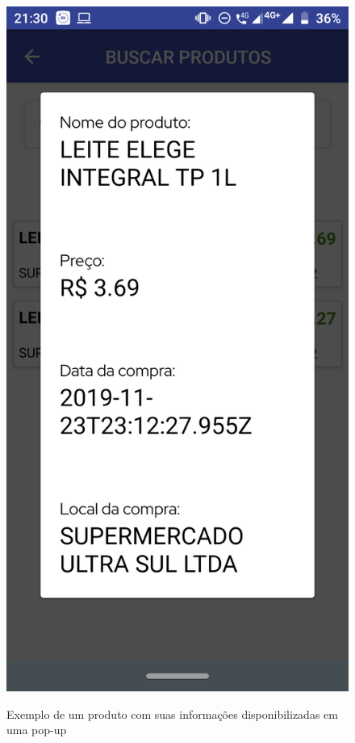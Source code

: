 \begin{figure}[h]
    \centering
    \caption{Exemplo de um produto com suas informações disponibilizadas em uma pop-up}
    \includegraphics[scale=0.15]{tcc/figures/app/app_buscar_produtos_produto.png}
    \label{appBuscaProdutosProdutoAmpliadoFig}
\end{figure}

